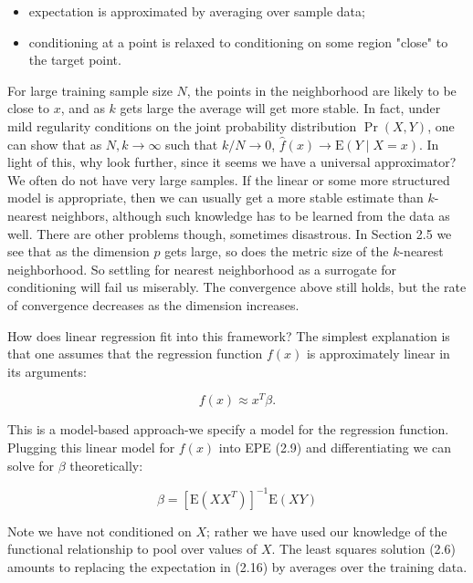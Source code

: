 \documentclass[10pt]{article}
\begin{document}
\begin{itemize}
  \item expectation is approximated by averaging over sample data;
  \item conditioning at a point is relaxed to conditioning on some region "close" to the target point.
\end{itemize}

For large training sample size $N$, the points in the neighborhood are likely to be close to $x$, and as $k$ gets large the average will get more stable. In fact, under mild regularity conditions on the joint probability distribution $\operatorname{Pr}(X, Y)$, one can show that as $N, k \rightarrow \infty$ such that $k / N \rightarrow 0$, $\hat{f}(x) \rightarrow \mathrm{E}(Y \mid X=x)$. In light of this, why look further, since it seems we have a universal approximator? We often do not have very large samples. If the linear or some more structured model is appropriate, then we can usually get a more stable estimate than $k$-nearest neighbors, although such knowledge has to be learned from the data as well. There are other problems though, sometimes disastrous. In Section 2.5 we see that as the dimension $p$ gets large, so does the metric size of the $k$-nearest neighborhood. So settling for nearest neighborhood as a surrogate for conditioning will fail us miserably. The convergence above still holds, but the rate of convergence decreases as the dimension increases.

How does linear regression fit into this framework? The simplest explanation is that one assumes that the regression function $f(x)$ is approximately linear in its arguments:


\begin{equation*}
f(x) \approx x^{T} \beta . \tag{2.15}
\end{equation*}


This is a model-based approach-we specify a model for the regression function. Plugging this linear model for $f(x)$ into EPE (2.9) and differentiating we can solve for $\beta$ theoretically:


\begin{equation*}
\beta=\left[\mathrm{E}\left(X X^{T}\right)\right]^{-1} \mathrm{E}(X Y) \tag{2.16}
\end{equation*}


Note we have not conditioned on $X$; rather we have used our knowledge of the functional relationship to pool over values of $X$. The least squares solution (2.6) amounts to replacing the expectation in (2.16) by averages over the training data.
\end{document}
